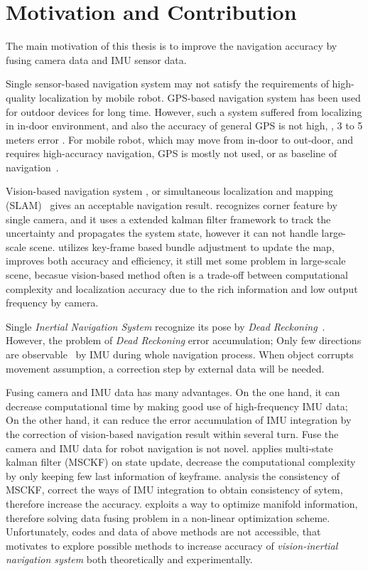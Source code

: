 \section{Motivation and Contribution}
\label{sec:motiv_contrib}

The main motivation of this thesis is to improve the navigation accuracy by fusing camera data and IMU sensor data. 

Single sensor-based navigation system may not satisfy the requirements of high-quality localization by mobile robot. GPS-based navigation system has been used for outdoor devices for long time. However, such a system suffered from localizing in in-door environment, and also the accuracy of general GPS is not high, \ie, 3 to 5 meters error \cite{wiki:GPS}. For mobile robot, which may move from in-door to out-door, and requires high-accuracy navigation, GPS is mostly not used, or as baseline of navigation~\cite{hesch2014consistency}.   

Vision-based navigation system \cite{davison2003real, klein2007parallel}, or simultaneous localization and mapping (SLAM)~\cite{davison2007monoslam, engel2014lsd, mur2015orb} gives an acceptable navigation result. \cite{davison2003real} recognizes corner feature by single camera, and it uses a extended kalman filter framework to track the uncertainty and propagates the system state, however it can not handle large-scale scene. \cite{klein2007parallel} utilizes key-frame based bundle adjustment to update the map, improves both accuracy and efficiency, it still met some problem in large-scale scene, becasue vision-based method often is a trade-off between computational complexity and localization accuracy due to the rich information and low output frequency by camera. 

Single \textit{Inertial Navigation System} recognize its pose by \textit{Dead Reckoning}~\cite{mcnaughton1991dead, levi1996dead}. However, the problem of \textit{Dead Reckoning} error accumulation; Only few directions are observable~\cite{hesch2014consistency} by IMU during whole navigation process. When object corrupts movement assumption, a correction step by external data will be needed.

Fusing camera and IMU data has many advantages. On the one hand, it can decrease computational time by making good use of high-frequency IMU data; On the other hand, it can reduce the error accumulation of IMU integration by the correction of vision-based navigation result within several turn. Fuse the camera and IMU data for robot navigation is not novel. \cite{mourikis2007multi} applies multi-state kalman filter (MSCKF) on state update, decrease the computational complexity by only keeping few last information of keyframe. \cite{hesch2014consistency} analysis the consistency of MSCKF, correct the ways of IMU integration to obtain consistency of sytem, therefore increase the accuracy. \cite{forster2015imu} exploits a way to optimize manifold information, therefore solving data fusing problem in a non-linear optimization scheme. Unfortunately, codes and data of above methods are not accessible, that motivates to explore possible methods to increase accuracy of \textit{vision-inertial navigation system} both theoretically and experimentally.

